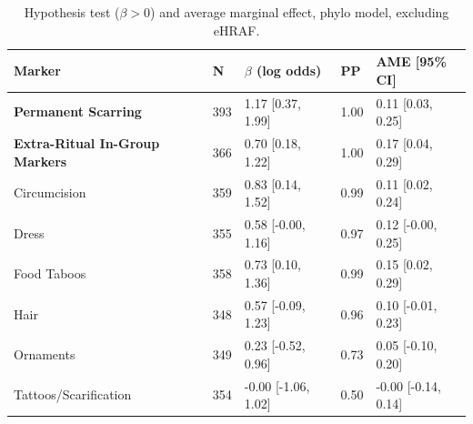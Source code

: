 \begin{table}[!ht]
\centering
\small
\caption{Hypothesis test ($\beta > 0$) and average marginal effect, phylo model, excluding eHRAF.}
\label{tab:extnoehraf_hypothesis_ame_phylo}
\begin{tabular}{lllll}
\toprule
Marker & N & $\beta$ (log odds) & PP & AME [95\% CI] \\
\midrule
\textbf{Permanent Scarring} & 393 & 1.17 [0.37, 1.99] & 1.00 & 0.11 [0.03, 0.25] \\
\textbf{Extra-Ritual In-Group Markers} & 366 & 0.70 [0.18, 1.22] & 1.00 & 0.17 [0.04, 0.29] \\
\midrule
Circumcision & 359 & 0.83 [0.14, 1.52] & 0.99 & 0.11 [0.02, 0.24] \\
Dress & 355 & 0.58 [-0.00, 1.16] & 0.97 & 0.12 [-0.00, 0.25] \\
Food Taboos & 358 & 0.73 [0.10, 1.36] & 0.99 & 0.15 [0.02, 0.29] \\
Hair & 348 & 0.57 [-0.09, 1.23] & 0.96 & 0.10 [-0.01, 0.23] \\
Ornaments & 349 & 0.23 [-0.52, 0.96] & 0.73 & 0.05 [-0.10, 0.20] \\
Tattoos/Scarification & 354 & -0.00 [-1.06, 1.02] & 0.50 & -0.00 [-0.14, 0.14] \\
\bottomrule
\end{tabular}
\end{table}